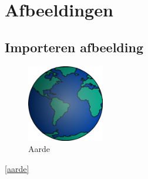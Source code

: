 \chapter{Afbeeldingen}
\label{afbeeldingen}

\section{Importeren afbeelding}

\blindtext

\begin{figure}[h!]
	\centering
	\includegraphics[width=0.3\textwidth]{boek-bestanden/aarde.png}
	\caption{Aarde}
	\label{aarde}
\end{figure}

\blindtext

\autoref{aarde}